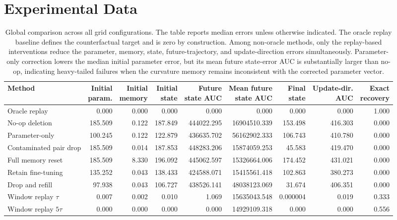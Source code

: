 \documentclass{ssl}
\begin{document}
\section{Experimental Data}
\begin{landscape}
\begin{table}[t]
\centering
\caption{
Global comparison across all grid configurations. 
The table reports median errors unless otherwise indicated. 
The oracle replay baseline defines the counterfactual target and is zero by construction. 
Among non-oracle methods, only the replay-based interventions reduce the parameter, memory, state, future-trajectory, and update-direction errors simultaneously. 
Parameter-only correction lowers the median initial parameter error, but its mean future state-error AUC is substantially larger than no-op, indicating heavy-tailed failures when the curvature memory remains inconsistent with the corrected parameter vector.
}
\label{tab:global-method-comparison}
\small
\begin{tabularx}{\textwidth}{lrrrrrrrr}
\toprule
Method 
& \makecell{Initial\\param.}
& \makecell{Initial\\memory}
& \makecell{Initial\\state}
& \makecell{Future\\state AUC}
& \makecell{Mean future\\state AUC}
& \makecell{Final\\state}
& \makecell{Update-dir.\\AUC}
& \makecell{Exact\\recovery} \\
\midrule
Oracle replay 
& 0.000 & 0.000 & 0.000 & 0.000 & 0.000 & 0.000 & 0.000 & 1.000 \\
No-op deletion 
& 185.509 & 0.122 & 187.849 & 444022.295 & 16904510.339 & 153.498 & 416.303 & 0.000 \\
Parameter-only 
& 100.245 & 0.122 & 122.879 & 436635.702 & 56162902.333 & 106.743 & 410.780 & 0.000 \\
Contaminated pair drop 
& 185.509 & 0.014 & 187.853 & 448283.206 & 15874059.253 & 45.583 & 419.470 & 0.000 \\
Full memory reset 
& 185.509 & 8.330 & 196.092 & 445062.597 & 15326664.006 & 174.452 & 431.021 & 0.000 \\
Retain fine-tuning 
& 135.252 & 0.043 & 138.433 & 424588.071 & 15415561.418 & 102.863 & 380.273 & 0.000 \\
Drop and refill 
& 97.938 & 0.043 & 106.727 & 438526.141 & 48038123.069 & 31.674 & 406.351 & 0.000 \\
Window replay $\tau$ 
& 0.007 & 0.002 & 0.010 & 1.069 & 15635043.548 & 0.000004 & 0.019 & 0.333 \\
Window replay $5\tau$ 
& 0.000 & 0.000 & 0.000 & 0.000 & 14929109.318 & 0.000 & 0.000 & 0.556 \\
\bottomrule
\end{tabularx}
\end{table}
\end{landscape}
\end{document}
